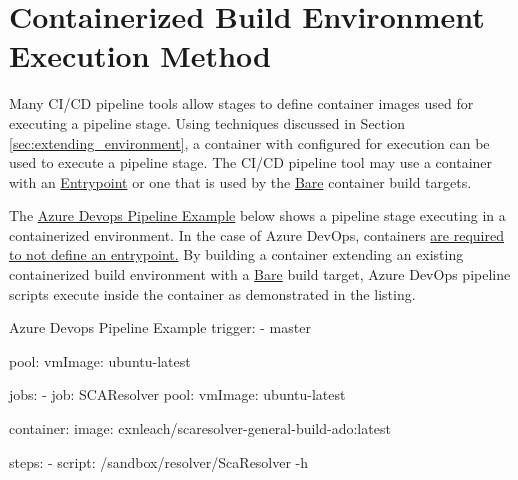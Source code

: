\section{Containerized Build Environment Execution Method}

Many CI/CD pipeline tools allow stages to define container images used for
executing a pipeline stage.  Using techniques discussed in
Section \ref{sec:extending_environment}, a container with \scaresolver
configured for execution can be used to execute a pipeline stage.  The
CI/CD pipeline tool may use a container with an 
\hyperref[ssec:entrypoint_targets]{Entrypoint} or one that
is used by the \hyperref[ssec:bare_targets]{Bare} container build targets.

The \hyperref[listing:ado_pipeline2]{Azure Devops Pipeline Example} below 
shows a pipeline stage executing \scaresolver in a containerized environment.
In the case of Azure DevOps, containers
\href{https://learn.microsoft.com/en-us/azure/devops/pipelines/process/container-phases?view=azure-devops#requirements}{are required to not define an entrypoint.}
By building a container extending an existing containerized build
environment with a \hyperref[ssec:bare_targets]{Bare} build target, Azure DevOps
pipeline scripts execute inside the container as demonstrated in the listing.

\label{listing:ado_pipeline2}
\begin{code}{Azure Devops Pipeline Example}{}{}
trigger:
    - master

pool:
    vmImage: ubuntu-latest

jobs:
    - job: SCAResolver
        pool:
            vmImage: ubuntu-latest

        container: 
            image: cxnleach/scaresolver-general-build-ado:latest

        steps:
            - script: /sandbox/resolver/ScaResolver -h
\end{code}
